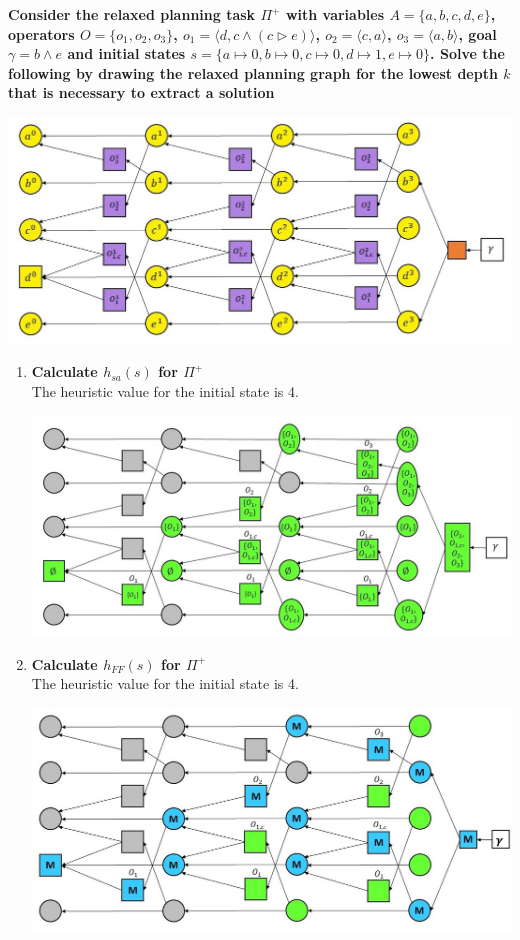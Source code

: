 \documentclass[12pt,a4paper]{article}
\begin{document}
\textbf{Consider the relaxed planning task $\Pi^+$ with variables 
$A=\{a,b,c,d,e\}$, operators $O=\{o_1,o_2,o_3\}$, $o_1=\langle d, c \land (c \triangleright e)\rangle$,
$o_2= \langle c , a \rangle$, $o_3= \langle a, b\rangle$, goal
$\gamma = b \land e$ and initial states $s=\{ a\mapsto 0, 
b\mapsto 0, c \mapsto 0, d \mapsto 1, e \mapsto 0 \}$. Solve the following
by drawing the relaxed planning graph for the lowest depth $k$
that is necessary to extract a solution}
\begin{center}
	\includegraphics[scale=0.5]{img1.jpg}\\
\end{center}
\begin{enumerate}[label=(\alph*), listparindent=1.5em]
	\item \textbf{Calculate $h_{sa}(s)$ for $\Pi^+ $}\\
	The heuristic value for the initial state is 4.
	\begin{center}
		\includegraphics[scale=0.5]{hsa.jpg}\\
	\end{center}
	\item \textbf{Calculate $h_{FF}(s)$ for $\Pi^+ $}\\
	The heuristic value for the initial state is 4.
	\begin{center}
		\includegraphics[scale=0.5]{hff.jpg}\\
	\end{center}
\end{enumerate}
\end{document}
